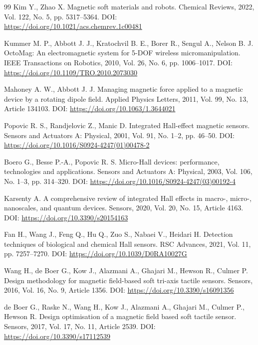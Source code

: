 \documentclass[14pt,a4paper]{extarticle}
\begin{document}
\begin{thebibliography}{99}
Kim Y., Zhao X.
\newblock Magnetic soft materials and robots.
\newblock Chemical Reviews, 2022, Vol. 122, No. 5, pp. 5317--5364.
\newblock DOI: \url{https://doi.org/10.1021/acs.chemrev.1c00481}

Kummer M. P., Abbott J. J., Kratochvil B. E., Borer R., Sengul A., Nelson B. J.
\newblock OctoMag: An electromagnetic system for 5-DOF wireless micromanipulation.
\newblock IEEE Transactions on Robotics, 2010, Vol. 26, No. 6, pp. 1006--1017.
\newblock DOI: \url{https://doi.org/10.1109/TRO.2010.2073030}

Mahoney A. W., Abbott J. J.
\newblock Managing magnetic force applied to a magnetic device by a rotating dipole field.
\newblock Applied Physics Letters, 2011, Vol. 99, No. 13, Article 134103.
\newblock DOI: \url{https://doi.org/10.1063/1.3644021}

Popovic R. S., Randjelovic Z., Manic D.
\newblock Integrated Hall-effect magnetic sensors.
\newblock Sensors and Actuators A: Physical, 2001, Vol. 91, No. 1--2, pp. 46--50.
\newblock DOI: \url{https://doi.org/10.1016/S0924-4247(01)00478-2}

Boero G., Besse P.-A., Popovic R. S.
\newblock Micro-Hall devices: performance, technologies and applications.
\newblock Sensors and Actuators A: Physical, 2003, Vol. 106, No. 1--3, pp. 314--320.
\newblock DOI: \url{https://doi.org/10.1016/S0924-4247(03)00192-4}

Karsenty A.
\newblock A comprehensive review of integrated Hall effects in macro-, micro-, nanoscales, and quantum devices.
\newblock Sensors, 2020, Vol. 20, No. 15, Article 4163.
\newblock DOI: \url{https://doi.org/10.3390/s20154163}

Fan H., Wang J., Feng Q., Hu Q., Zuo S., Nabaei V., Heidari H.
\newblock Detection techniques of biological and chemical Hall sensors.
\newblock RSC Advances, 2021, Vol. 11, pp. 7257--7270.
\newblock DOI: \url{https://doi.org/10.1039/D0RA10027G}

Wang H., de Boer G., Kow J., Alazmani A., Ghajari M., Hewson R., Culmer P.
\newblock Design methodology for magnetic field-based soft tri-axis tactile sensors.
\newblock Sensors, 2016, Vol. 16, No. 9, Article 1356.
\newblock DOI: \url{https://doi.org/10.3390/s16091356}

de Boer G., Raske N., Wang H., Kow J., Alazmani A., Ghajari M., Culmer P., Hewson R.
\newblock Design optimisation of a magnetic field based soft tactile sensor.
\newblock Sensors, 2017, Vol. 17, No. 11, Article 2539.
\newblock DOI: \url{https://doi.org/10.3390/s17112539}


\end{thebibliography}
\end{document}
